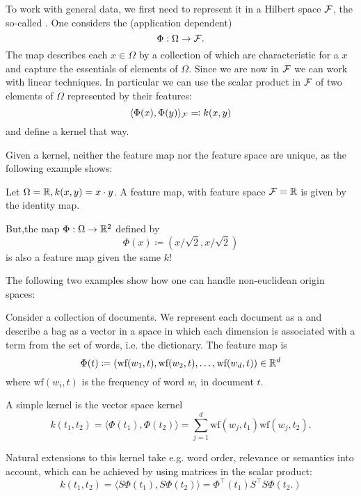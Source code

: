 To work with general data, 
we first need to represent it in a Hilbert space
$\mathcal{F}$, the so-called . 
One considers the (application dependent) 
\[\Phi:\Omega\to\mathcal{F}.\]
The map describes each $x\in\Omega$ by a collection of  which are 
characteristic for a $x$ and capture the essentials of elements of $\Omega$. 
Since we are now in $\mathcal{F}$ we can work with linear techniques. In particular we can use 
the scalar product in $\mathcal{F}$ of two elements of $\Omega$ represented by their features:
\[\langle\Phi(x),\Phi(y) \rangle_{\mathcal{F}}\eqqcolon k(x,y)\]
and define a kernel that way.

\begin{remark}
    Given a kernel, neither the feature map nor the feature space are unique, as the following example shows:
\end{remark}
\begin{example}
    Let $\Omega=\mathbb{R},k(x,y)=x\cdot y$. A feature map, with feature space $\mathcal{F}=\mathbb{R}$ is given by the identity map.

    But,the map $\Phi:\Omega\to\mathbb{R}^2$ defined by 
    \[\Phi(x)\coloneqq (x/\sqrt{2},x/\sqrt{2})\]
    is also a feature map given the same $k$! 
\end{example}
The following two examples show how one can handle non-euclidean origin spaces:
\begin{example}
    Consider a collection of documents. 
    We represent each document as a 
    and describe a bag as a vector in a space in which each dimension is associated
    with a term from the set of words, i.e. the dictionary. The feature map is 
    \[\Phi(t)\coloneqq(\text{wf}(w_1,t),\text{wf}(w_2,t),\dots,\text{wf}(w_d,t))\in\mathbb{R}^d\]
    where $\text{wf}(w_i,t)$ is the frequency of word $w_i$ in document $t$.
    
    A simple kernel is the vector space kernel
    \[k(t_1,t_2)=\langle \Phi(t_1),\Phi(t_2)\rangle=\sum_{j=1}^d \text{wf}(w_j,t_1)\text{wf}(w_j,t_2).\]

    Natural extensions to this kernel take e.g. word order, relevance or semantics into account,
    which can be achieved by using matrices in the scalar product:
    \[k(t_1,t_2)=\langle S\Phi(t_1),S\Phi(t_2)\rangle=\Phi^\intercal(t_1)S^\intercal S\Phi(t_2.)\]
\end{example}

